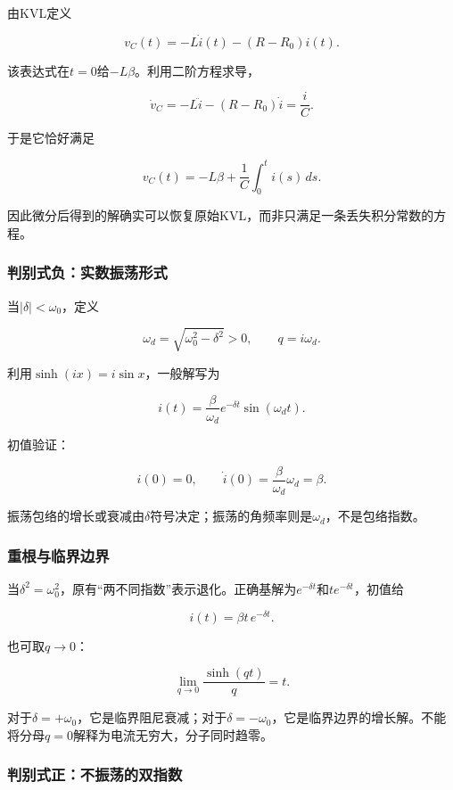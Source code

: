 \documentclass[12pt,a4paper,fontset=fandol]{ctexart}
\begin{document}
由KVL定义

\[
v_C(t)=-L\dot i(t)-(R-R_0)i(t).
\]

该表达式在\(t=0\)给\(-L\beta\)。利用二阶方程求导，

\[
\dot v_C=-L\ddot i-(R-R_0)\dot i=\frac iC.
\]

于是它恰好满足

\[
v_C(t)=-L\beta+\frac1C\int_0^ti(s)\,ds.
\]

因此微分后得到的解确实可以恢复原始KVL，而非只满足一条丢失积分常数的方程。

\subsubsection{判别式负：实数振荡形式}\label{ux5224ux522bux5f0fux8d1fux5b9eux6570ux632fux8361ux5f62ux5f0f}

当\(|\delta|<\omega_0\)，定义

\[
\omega_d=\sqrt{\omega_0^2-\delta^2}>0,
\qquad q=i\omega_d.
\]

利用\(\sinh(ix)=i\sin x\)，一般解写为

\[
\boxed{
i(t)=\frac{\beta}{\omega_d}
e^{-\delta t}\sin(\omega_dt)}.
\]

初值验证：

\[
i(0)=0,\qquad
\dot i(0)=\frac{\beta}{\omega_d}\omega_d=\beta.
\]

振荡包络的增长或衰减由\(\delta\)符号决定；振荡的角频率则是\(\omega_d\)，不是包络指数。

\subsubsection{重根与临界边界}\label{ux91cdux6839ux4e0eux4e34ux754cux8fb9ux754c}

当\(\delta^2=\omega_0^2\)，原有``两不同指数''表示退化。正确基解为\(e^{-\delta t}\)和\(te^{-\delta t}\)，初值给

\[
\boxed{i(t)=\beta t\,e^{-\delta t}}.
\]

也可取\(q\to0\)：

\[
\lim_{q\to0}\frac{\sinh(qt)}q=t.
\]

对于\(\delta=+\omega_0\)，它是临界阻尼衰减；对于\(\delta=-\omega_0\)，它是临界边界的增长解。不能将分母\(q=0\)解释为电流无穷大，分子同时趋零。

\subsubsection{判别式正：不振荡的双指数}\label{ux5224ux522bux5f0fux6b63ux4e0dux632fux8361ux7684ux53ccux6307ux6570}
\end{document}
